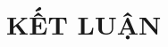 \documentclass[a4paper,13pt,3p,oneside]{report}
\renewcommand{\bibname}{Danh_sach_tai_lieu_tham_khao}
\theoremstyle{definition}
\begin{document}
\newpage
\chapter{KẾT LUẬN}
\label{chapter:conclusion}


% 

% 

% 

% 


\newpage
\renewcommand\bibname{TÀI LIỆU THAM KHẢO}


\end{document}
